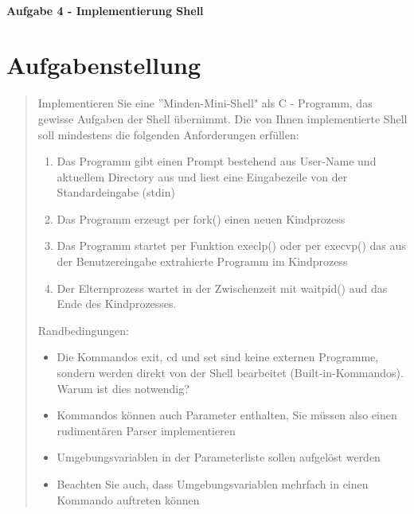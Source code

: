 \newpage

\paragraph{\LARGE Aufgabe 4 - Implementierung Shell}

\section{Aufgabenstellung}
	\begin{quote}
		Implementieren Sie eine ''Minden-Mini-Shell" als C - Programm, das gewisse Aufgaben der Shell \"ubernimmt. Die von Ihnen implementierte Shell soll mindestens die folgenden Anforderungen erf\"ullen:\\
		\begin{enumerate}
			\item Das Programm gibt einen Prompt bestehend aus User-Name und aktuellem Directory aus und liest eine Eingabezeile von der Standardeingabe (stdin)\\
			\item Das Programm erzeugt per fork() einen neuen Kindprozess\\
			\item Das Programm startet per Funktion execlp() oder per execvp() das aus der Benutzereingabe extrahierte Programm im Kindprozess\\
			\item Der Elternprozess wartet in der Zwischenzeit mit waitpid() aud das Ende des Kindprozesses.\\
		\end{enumerate}
		Randbedingungen:\\
		\begin{itemize}
			\item Die Kommandos exit, cd und set sind keine externen Programme, sondern werden direkt von der Shell bearbeitet (Built-in-Kommandos). Warum ist  dies notwendig?\\
			\item Kommandos k\"onnen auch Parameter enthalten, Sie m\"ussen also einen rudiment\"aren Parser implementieren\\
			\item Umgebungsvariablen in der Parameterliste sollen aufgel\"ost werden\\
			\item Beachten Sie auch, dass Umgebungsvariablen mehrfach in einen Kommando auftreten k\"onnen\\
		\end{itemize}
	\end{quote}
\newpage
